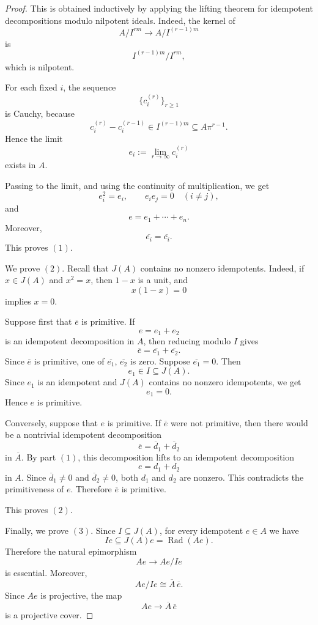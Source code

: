 \begin{proof}
    This is obtained inductively by applying the lifting theorem for idempotent
    decompositions modulo nilpotent ideals. Indeed, the kernel of
    \[
        A/I^{rm}\longrightarrow A/I^{(r-1)m}
    \]
    is
    \[
        I^{(r-1)m}/I^{rm},
    \]
    which is nilpotent.

    For each fixed \(i\), the sequence
    \[
        \{c_i^{(r)}\}_{r\geq 1}
    \]
    is Cauchy, because
    \[
        c_i^{(r)}-c_i^{(r-1)}\in I^{(r-1)m}\subseteq A\pi^{r-1}.
    \]
    Hence the limit
    \[
        e_i:=\lim_{r\to\infty}c_i^{(r)}
    \]
    exists in \(A\).

    Passing to the limit, and using the continuity of multiplication, we get
    \[
        e_i^2=e_i,
        \qquad
        e_ie_j=0\quad (i\neq j),
    \]
    and
    \[
        e=e_1+\cdots+e_n.
    \]
    Moreover,
    \[
        \overline{e_i}=\overline{c_i}.
    \]
    This proves \((1)\).

    We prove \((2)\). Recall that \(J(A)\) contains no nonzero idempotents. Indeed, if
    \(x\in J(A)\) and \(x^2=x\), then \(1-x\) is a unit, and
    \[
        x(1-x)=0
    \]
    implies \(x=0\).

    Suppose first that \(\overline{e}\) is primitive. If
    \[
        e=e_1+e_2
    \]
    is an idempotent decomposition in \(A\), then reducing modulo \(I\) gives
    \[
        \overline{e}
        =
        \overline{e_1}+\overline{e_2}.
    \]
    Since \(\overline{e}\) is primitive, one of \(\overline{e_1}\), \(\overline{e_2}\)
    is zero. Suppose \(\overline{e_1}=0\). Then
    \[
        e_1\in I\subseteq J(A).
    \]
    Since \(e_1\) is an idempotent and \(J(A)\) contains no nonzero idempotents, we
    get
    \[
        e_1=0.
    \]
    Hence \(e\) is primitive.

    Conversely, suppose that \(e\) is primitive. If \(\overline{e}\) were not primitive,
    then there would be a nontrivial idempotent decomposition
    \[
        \overline{e}
        =
        \overline{d}_1+\overline{d}_2
    \]
    in \(\overline{A}\). By part \((1)\), this decomposition lifts to an idempotent
    decomposition
    \[
        e=d_1+d_2
    \]
    in \(A\). Since \(\overline{d}_1\neq 0\) and \(\overline{d}_2\neq 0\), both \(d_1\)
    and \(d_2\) are nonzero. This contradicts the primitiveness of \(e\). Therefore
    \(\overline{e}\) is primitive.

    This proves \((2)\).

    Finally, we prove \((3)\). Since \(I\subseteq J(A)\), for every idempotent \(e\in A\)
    we have
    \[
        Ie\subseteq J(A)e=\operatorname{Rad}(Ae).
    \]
    Therefore the natural epimorphism
    \[
        Ae\longrightarrow Ae/Ie
    \]
    is essential. Moreover,
    \[
        Ae/Ie\cong \overline{A}\,\overline{e}.
    \]
    Since \(Ae\) is projective, the map
    \[
        Ae\longrightarrow \overline{A}\,\overline{e}
    \]
    is a projective cover.


\end{proof}
